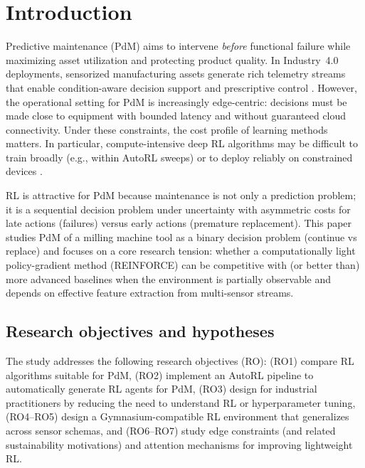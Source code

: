 \documentclass[11pt]{article}
\begin{document}
\section{Introduction}
\label{sec:intro}
Predictive maintenance (PdM) aims to intervene \emph{before} functional failure while maximizing asset utilization and protecting product quality. In Industry~4.0 deployments, sensorized manufacturing assets generate rich telemetry streams that enable condition-aware decision support and prescriptive control \parencite{Zonta2020PdM, Compare2020IoT}. However, the operational setting for PdM is increasingly edge-centric: decisions must be made close to equipment with bounded latency and without guaranteed cloud connectivity. Under these constraints, the cost profile of learning methods matters. In particular, compute-intensive deep RL algorithms may be difficult to train broadly (e.g., within AutoRL sweeps) or to deploy reliably on constrained devices \parencite{Njor2024TinyML, Pandey2023EdgeDNN}.

RL is attractive for PdM because maintenance is not only a prediction problem; it is a sequential decision problem under uncertainty with asymmetric costs for late actions (failures) versus early actions (premature replacement). This paper studies PdM of a milling machine tool as a binary decision problem (continue vs replace) and focuses on a core research tension: whether a computationally light policy-gradient method (REINFORCE) can be competitive with (or better than) more advanced baselines when the environment is partially observable and depends on effective feature extraction from multi-sensor streams.

\subsection{Research objectives and hypotheses}
The study addresses the following research objectives (RO): (RO1) compare RL algorithms suitable for PdM, (RO2) implement an AutoRL pipeline to automatically generate RL agents for PdM, (RO3) design for industrial practitioners by reducing the need to understand RL or hyperparameter tuning, (RO4--RO5) design a Gymnasium-compatible RL environment that generalizes across sensor schemas, and (RO6--RO7) study edge constraints (and related sustainability motivations) and attention mechanisms for improving lightweight RL.
\end{document}

